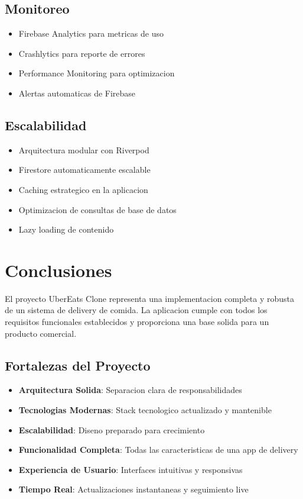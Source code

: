 \documentclass[12pt,a4paper]{article}
\begin{document}
\subsection{Monitoreo}
\begin{itemize}[itemsep=0.5em]
    \item Firebase Analytics para metricas de uso
    \item Crashlytics para reporte de errores
    \item Performance Monitoring para optimizacion
    \item Alertas automaticas de Firebase
\end{itemize}

\subsection{Escalabilidad}
\begin{itemize}[itemsep=0.5em]
    \item Arquitectura modular con Riverpod
    \item Firestore automaticamente escalable
    \item Caching estrategico en la aplicacion
    \item Optimizacion de consultas de base de datos
    \item Lazy loading de contenido
\end{itemize}

\section{Conclusiones}

El proyecto UberEats Clone representa una implementacion completa y robusta de un sistema de delivery de comida. La aplicacion cumple con todos los requisitos funcionales establecidos y proporciona una base solida para un producto comercial.

\subsection{Fortalezas del Proyecto}
\begin{itemize}[itemsep=0.5em]
    \item \textbf{Arquitectura Solida}: Separacion clara de responsabilidades
    \item \textbf{Tecnologias Modernas}: Stack tecnologico actualizado y mantenible
    \item \textbf{Escalabilidad}: Diseno preparado para crecimiento
    \item \textbf{Funcionalidad Completa}: Todas las caracteristicas de una app de delivery
    \item \textbf{Experiencia de Usuario}: Interfaces intuitivas y responsivas
    \item \textbf{Tiempo Real}: Actualizaciones instantaneas y seguimiento live
\end{itemize}
\end{document}
